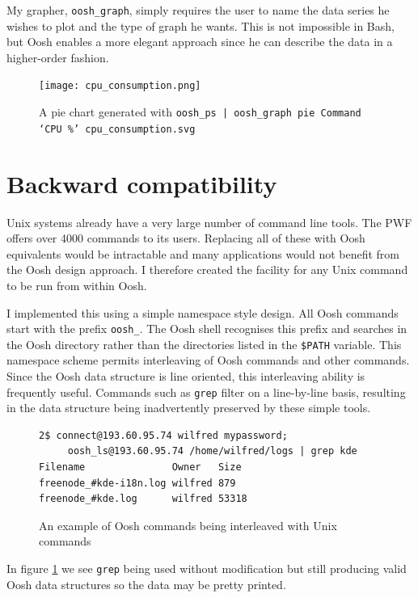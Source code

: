 \documentclass[12pt,twoside,notitlepage]{report}
\begin{document}
My grapher, {\tt oosh\_graph}, simply requires the user to name the
data series he wishes to plot and the type of graph he wants. This is
not impossible in Bash, but Oosh enables a more elegant approach since
he can describe the data in a higher-order fashion.

\begin{figure}[h]
  \caption{A pie chart generated with {\tt oosh\_ps | oosh\_graph pie Command `CPU \%' cpu\_consumption.svg}}
  \centering
  \texttt{[image: cpu\_consumption.png]}
\end{figure}

\section{Backward compatibility}

Unix systems already have a very large number of command line
tools. The PWF offers over 4000 commands to its users. Replacing all of these
with Oosh equivalents would be intractable and many applications would
not benefit from the Oosh design approach. I therefore created the
facility for any Unix command to be run from within Oosh. 

I implemented this using a simple namespace style design. All Oosh
commands start with the prefix {\tt oosh\_}. The Oosh shell recognises
this prefix and searches in the Oosh directory rather than the
directories listed in the {\tt \$PATH} variable. This namespace scheme
permits interleaving of Oosh commands and other commands. Since the
Oosh data structure is line oriented, this interleaving ability is
frequently useful. Commands such as {\tt grep} filter on a
line-by-line basis, resulting in the data structure being
inadvertently preserved by these simple tools.

\begin{figure}[h]
\label{grepexample}
\caption{An example of Oosh commands being interleaved with Unix commands}
\begin{verbatim}
2$ connect@193.60.95.74 wilfred mypassword;
     oosh_ls@193.60.95.74 /home/wilfred/logs | grep kde
Filename               Owner   Size
freenode_#kde-i18n.log wilfred 879
freenode_#kde.log      wilfred 53318
\end{verbatim}
\end{figure}

In figure \ref{grepexample} we see {\tt grep} being used without
modification but still producing valid Oosh data structures so the
data may be pretty printed.
\end{document}
